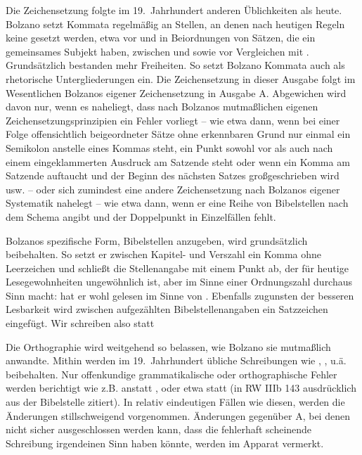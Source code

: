 \begin{aufza}
\item Die Zeichensetzung folgte im 19.~Jahrhundert anderen Üblichkeiten als heute. Bolzano setzt Kommata regelmäßig an Stellen, an denen nach heutigen Regeln keine gesetzt werden, etwa vor  und  in Beiordnungen von Sätzen, die ein gemeinsames Subjekt haben, zwischen  und  sowie vor Vergleichen mit . Grundsätzlich bestanden mehr Freiheiten. So setzt Bolzano Kommata auch als rhetorische Untergliederungen ein. Die Zeichensetzung in dieser Ausgabe folgt im Wesentlichen Bolzanos eigener Zeichensetzung in Ausgabe A. Abgewichen wird davon nur, wenn es naheliegt, dass nach Bolzanos mutmaßlichen eigenen Zeichensetzungsprinzipien ein Fehler vorliegt -- wie etwa dann, wenn bei einer Folge offensichtlich beigeordneter Sätze ohne erkennbaren Grund nur einmal ein Semikolon anstelle eines Kommas steht, ein Punkt sowohl vor als auch nach einem eingeklammerten Ausdruck am Satzende steht oder wenn ein Komma am Satzende auftaucht und der Beginn des nächsten Satzes großgeschrieben wird usw. -- oder sich zumindest eine andere Zeichensetzung nach Bolzanos eigener Systematik nahelegt -- wie etwa dann, wenn er eine Reihe von Bibelstellen nach dem Schema  angibt und der Doppelpunkt in Einzelfällen fehlt.
\item Bolzanos spezifische Form, Bibelstellen anzugeben, wird grundsätzlich beibehalten. So setzt er zwischen Kapitel- und Verszahl ein Komma ohne Leerzeichen und schließt die Stellenangabe mit einem Punkt ab, der für heutige Lesegewohnheiten ungewöhnlich ist, aber im Sinne einer Ordnungszahl durchaus Sinn macht:  hat er wohl gelesen im Sinne von . Ebenfalls zugunsten der besseren Lesbarkeit wird zwischen aufgezählten Bibelstellenangaben ein Satzzeichen eingefügt. Wir schreiben also  statt 
\item Die Orthographie wird weitgehend so belassen, wie Bolzano sie mutmaßlich anwandte. Mithin werden im 19.~Jahrhundert übliche Schreibungen wie , ,  u.ä. beibehalten. Nur offenkundige grammatikalische oder orthographische Fehler werden berichtigt wie z.B.  anstatt , oder etwa  statt  (in RW IIIb 143 ausdrücklich aus der Bibelstelle  zitiert). In relativ eindeutigen Fällen wie diesen, werden die Änderungen  stillschweigend vorgenommen.  Änderungen gegenüber A, bei denen nicht sicher ausgeschlossen werden kann, dass die fehlerhaft scheinende Schreibung irgendeinen Sinn haben könnte, werden im Apparat vermerkt.

\end{aufza}
